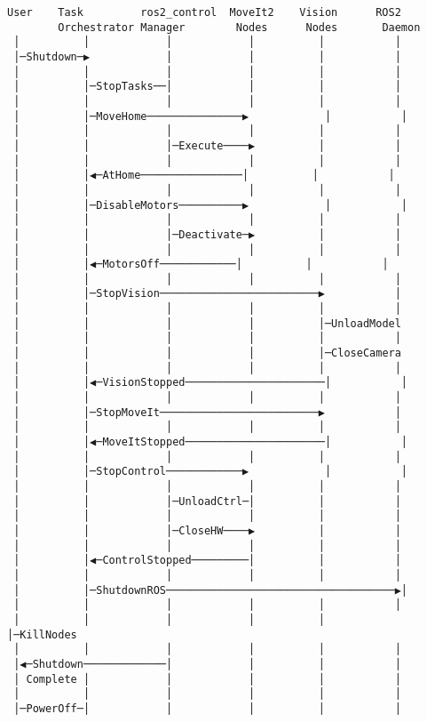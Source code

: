 \documentclass[
]{article}
\begin{document}
\begin{verbatim}
User    Task         ros2_control  MoveIt2    Vision      ROS2
        Orchestrator Manager        Nodes      Nodes       Daemon
 │          │            │            │          │           │
 │─Shutdown─▶            │            │          │           │
 │          │            │            │          │           │
 │          │─StopTasks──│            │          │           │
 │          │            │            │          │           │
 │          │─MoveHome───────────────▶            │           │
 │          │            │            │          │           │
 │          │            │─Execute────▶          │           │
 │          │            │            │          │           │
 │          │◀─AtHome────────────────│          │           │
 │          │            │            │          │           │
 │          │─DisableMotors──────────▶            │           │
 │          │            │            │          │           │
 │          │            │─Deactivate─▶          │           │
 │          │            │            │          │           │
 │          │◀─MotorsOff────────────│          │           │
 │          │            │            │          │           │
 │          │─StopVision─────────────────────────▶           │
 │          │            │            │          │           │
 │          │            │            │          │─UnloadModel
 │          │            │            │          │           │
 │          │            │            │          │─CloseCamera
 │          │            │            │          │           │
 │          │◀─VisionStopped──────────────────────│           │
 │          │            │            │          │           │
 │          │─StopMoveIt─────────────────────────▶           │
 │          │            │            │          │           │
 │          │◀─MoveItStopped──────────────────────│           │
 │          │            │            │          │           │
 │          │─StopControl────────────▶            │           │
 │          │            │            │          │           │
 │          │            │─UnloadCtrl─│          │           │
 │          │            │            │          │           │
 │          │            │─CloseHW────▶          │           │
 │          │            │            │          │           │
 │          │◀─ControlStopped─────────│          │           │
 │          │            │            │          │           │
 │          │─ShutdownROS────────────────────────────────────▶│
 │          │            │            │          │           │
 │          │            │            │          │           │─KillNodes
 │          │            │            │          │           │
 │◀─Shutdown─────────────│            │          │           │
 │ Complete │            │            │          │           │
 │          │            │            │          │           │
 │─PowerOff─│            │            │          │           │
\end{verbatim}
\end{document}
